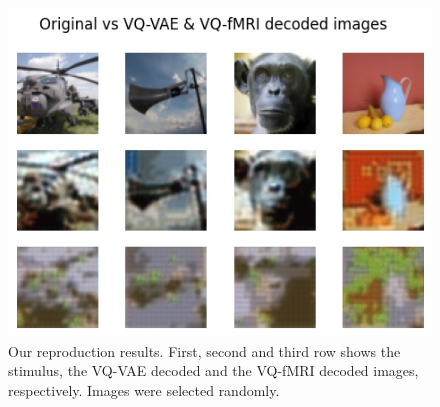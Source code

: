 \documentclass{article}
\theoremstyle{plain}
\theoremstyle{definition}
\theoremstyle{remark}
\begin{document}
\begin{figure}[t]
\begin{center}
\centerline{\includegraphics[width=\columnwidth]{decoded-imgs}}
\caption{Our reproduction results. First, second and third row shows the stimulus, the VQ-VAE decoded and the VQ-fMRI decoded images, respectively. Images were selected randomly.}
\label{decoded-imgs}
\end{center}
\vskip -0.2in
\end{figure}
\end{document}
